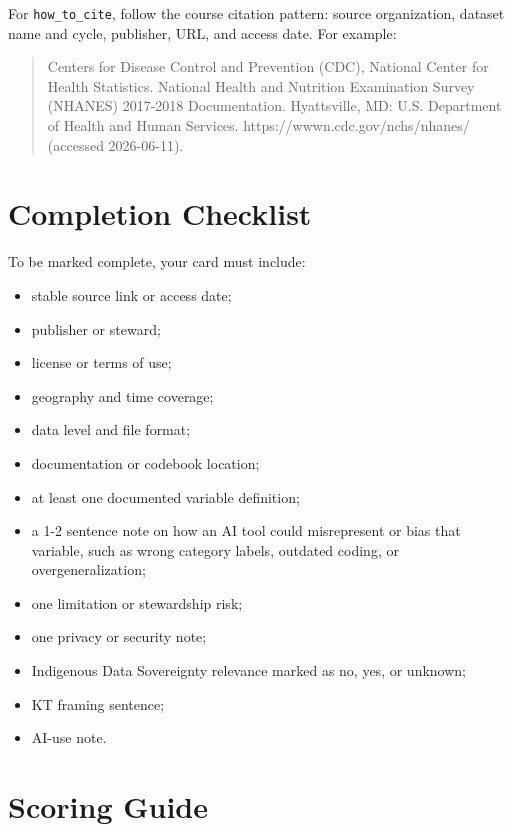 \documentclass[
  letterpaper,
  DIV=11,
  numbers=noendperiod,
  oneside]{scrreprt}
\providecommand{\tightlist}{%
  \setlength{\itemsep}{0pt}\setlength{\parskip}{0pt}}
\begin{document}
For \texttt{how\_to\_cite}, follow the course citation pattern: source
organization, dataset name and cycle, publisher, URL, and access date.
For example:

\begin{quote}
Centers for Disease Control and Prevention (CDC), National Center for
Health Statistics. National Health and Nutrition Examination Survey
(NHANES) 2017-2018 Documentation. Hyattsville, MD: U.S. Department of
Health and Human Services. https://wwwn.cdc.gov/nchs/nhanes/ (accessed
2026-06-11).
\end{quote}

\section*{Completion Checklist}\label{completion-checklist}


To be marked complete, your card must include:

\begin{itemize}
\tightlist
\item
  stable source link or access date;
\item
  publisher or steward;
\item
  license or terms of use;
\item
  geography and time coverage;
\item
  data level and file format;
\item
  documentation or codebook location;
\item
  at least one documented variable definition;
\item
  a 1-2 sentence note on how an AI tool could misrepresent or bias that
  variable, such as wrong category labels, outdated coding, or
  overgeneralization;
\item
  one limitation or stewardship risk;
\item
  one privacy or security note;
\item
  Indigenous Data Sovereignty relevance marked as no, yes, or unknown;
\item
  KT framing sentence;
\item
  AI-use note.
\end{itemize}

\section*{Scoring Guide}\label{scoring-guide}
\end{document}
